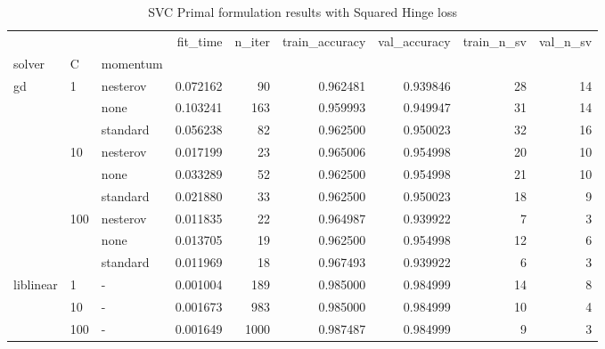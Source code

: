 \begin{table}[H]
\centering
\caption{SVC Primal formulation results with Squared Hinge loss}
\label{primal_svc_squared_hinge_cv_results}
\begin{tabular}{lllrrrrrr}
\toprule
          &     &   &  fit\_time &  n\_iter &  train\_accuracy &  val\_accuracy &  train\_n\_sv &  val\_n\_sv \\
solver & C & momentum &           &         &                 &               &             &           \\
\midrule
gd & 1   & nesterov &  0.072162 &      90 &        0.962481 &      0.939846 &          28 &        14 \\
          &     & none &  0.103241 &     163 &        0.959993 &      0.949947 &          31 &        14 \\
          &     & standard &  0.056238 &      82 &        0.962500 &      0.950023 &          32 &        16 \\
          & 10  & nesterov &  0.017199 &      23 &        0.965006 &      0.954998 &          20 &        10 \\
          &     & none &  0.033289 &      52 &        0.962500 &      0.954998 &          21 &        10 \\
          &     & standard &  0.021880 &      33 &        0.962500 &      0.950023 &          18 &         9 \\
          & 100 & nesterov &  0.011835 &      22 &        0.964987 &      0.939922 &           7 &         3 \\
          &     & none &  0.013705 &      19 &        0.962500 &      0.954998 &          12 &         6 \\
          &     & standard &  0.011969 &      18 &        0.967493 &      0.939922 &           6 &         3 \\
liblinear & 1   & - &  0.001004 &     189 &        0.985000 &      0.984999 &          14 &         8 \\
          & 10  & - &  0.001673 &     983 &        0.985000 &      0.984999 &          10 &         4 \\
          & 100 & - &  0.001649 &    1000 &        0.987487 &      0.984999 &           9 &         3 \\
\bottomrule
\end{tabular}
\end{table}
